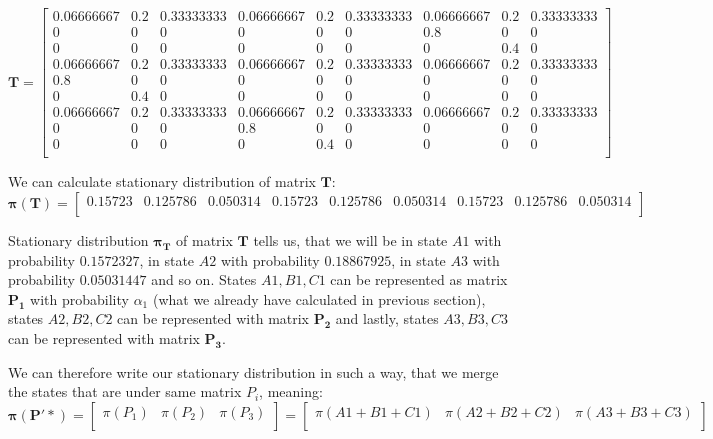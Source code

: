 \documentclass{article}
\begin{document}
\[\mathbf{T}=
\begin{bmatrix}
    0.06666667 & 0.2 & 0.33333333 &  0.06666667 &  0.2 & 0.33333333 & 0.06666667 & 0.2 & 0.33333333 \\
    0 & 0 & 0 & 0 & 0 & 0 & 0.8 & 0 & 0 \\
    0 & 0 & 0 & 0 & 0 & 0 & 0 & 0.4 & 0 \\
       0.06666667 & 0.2 & 0.33333333 &  0.06666667 &  0.2 & 0.33333333 & 0.06666667 & 0.2 & 0.33333333 \\
	   0.8 & 0 & 0 & 0 & 0 & 0 & 0 & 0 & 0 \\
	   0 & 0.4 & 0 & 0 & 0 & 0 & 0 & 0 & 0 \\
       0.06666667 & 0.2 & 0.33333333 &  0.06666667 &  0.2 & 0.33333333 & 0.06666667 & 0.2 & 0.33333333 \\
		  0 & 0 & 0 & 0.8 & 0 & 0 & 0 & 0 & 0 \\
		  0 & 0 & 0 & 0 &0.4 & 0 & 0 & 0 & 0 \\

\end{bmatrix}
\]

We can calculate stationary distribution of matrix $\mathbf{T}$:
\[\mathbf{\pi(T)} = 
\begin{bmatrix}
0.15723  & 0.125786 &  0.050314&  0.15723  & 0.125786 &  0.050314&  0.15723 &  0.125786 & 0.050314 \\
\end{bmatrix}
\]


Stationary distribution $\mathbf{\pi_T}$ of matrix $\mathbf{T}$ tells us, that we will be in state $A1$ with probability $0.1572327$, in state $A2$ with probability $0.18867925$, in state $A3$ with probability $0.05031447$ and so on. States $A1, B1, C1$ can be represented as matrix $\mathbf{P_1}$ with probability $\alpha_1$ (what we already have calculated in previous section), states $A2, B2, C2$ can be represented with matrix $\mathbf{P_2}$ and lastly, states $A3, B3, C3$ can be represented with matrix $\mathbf{P_3}$. 

We can therefore write our stationary distribution in such a way, that we merge the states that are under same matrix $P_i$, meaning: 
\[\mathbf{\pi(P'*)} = 
\begin{bmatrix}
\pi(P_1) & \pi(P_2) & \pi(P_3) \\
\end{bmatrix}
= \begin{bmatrix}
\pi(A1+B1+C1) & \pi(A2 + B2+C2) & \pi(A3 + B3 + C3) \\
\end{bmatrix}
\]
\end{document}
